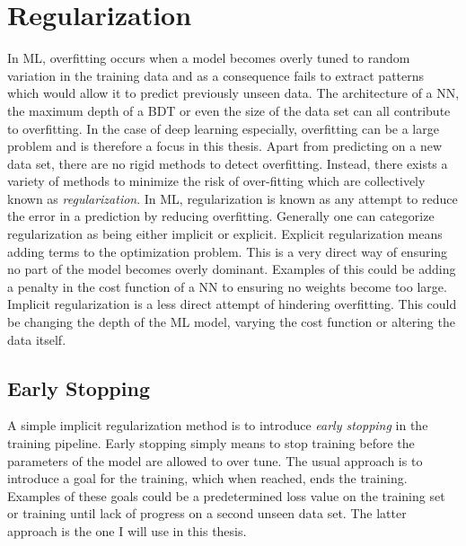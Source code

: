 \section{Regularization}\label{sec:Regularization}
In \ac{ML}, overfitting occurs when a model becomes overly tuned to random variation in the training data and as a consequence 
fails to extract patterns which would allow it to predict previously unseen data. The architecture of a \ac{NN}, 
the maximum depth of a \ac{BDT} or even the size of the data set can all contribute to overfitting. In the 
case of deep learning especially, overfitting can be a large problem and is therefore a focus in this thesis. Apart 
from predicting on a new data set, there are no rigid methods to detect overfitting. Instead, there exists 
a variety of methods to minimize the risk of over-fitting which are collectively known as \emph{regularization}. In \ac{ML}, 
regularization is known as any attempt to reduce the error in a prediction by reducing overfitting. Generally one can categorize
regularization as being either implicit or explicit. Explicit regularization means adding terms to the optimization 
problem. This is a very direct way of ensuring no part of the model becomes overly dominant. Examples of this 
could be adding a penalty in the cost function of a \ac{NN} to ensuring no weights become too large. Implicit
regularization is a less direct attempt of hindering overfitting. This could be changing the depth of the \ac{ML} model,
varying the cost function or altering the data itself.
\subsection{Early Stopping}\label{subsec:EarlyStopping}
A simple implicit regularization method is to introduce \emph{early stopping} in the training pipeline. Early stopping 
simply means to stop training before the parameters of the model are allowed to over tune. The usual approach 
is to introduce a goal for the training, which when reached, ends the training. Examples of these goals could be a 
predetermined loss value on the training set or training until lack of progress on a second unseen data set. The latter
approach is the one I will use in this thesis. 
